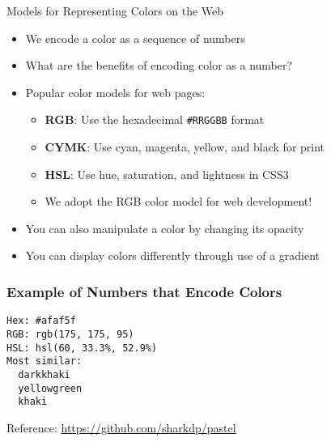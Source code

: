 \documentclass[14pt,aspectratio=169]{beamer}
\begin{document}
%
\begin{frame}{Models for Representing Colors on the Web}
  \begin{itemize}
    \item We encode a color as a sequence of numbers
      \vspace*{-.2in}
    \item What are the benefits of encoding color as a number?
      \vspace*{-.2in}
    \item Popular color models for web pages:
      \begin{itemize}
        \item {\bf RGB}: Use the hexadecimal {\tt \#RRGGBB} format
        \item {\bf CYMK}: Use cyan, magenta, yellow, and black for print
        \item {\bf HSL}: Use hue, saturation, and lightness in CSS3
        \item We adopt the RGB color model for web development!
      \end{itemize}
      \vspace*{-.25in}
    \item You can also manipulate a color by changing its opacity
      \vspace*{-.25in}
    \item You can display colors differently through use of a gradient
  \end{itemize}
\end{frame}

%
\begin{frame}[fragile]
  \frametitle{Example of Numbers that Encode Colors}
  \normalsize
  \begin{minipage}{6in}
    \vspace*{.1in}
    \begin{verbatim}
Hex: #afaf5f
RGB: rgb(175, 175, 95)
HSL: hsl(60, 33.3%, 52.9%)
Most similar:
  darkkhaki
  yellowgreen
  khaki
    \end{verbatim}
  \end{minipage}
  \vspace*{.1in}
  \begin{center}
    Reference: \url{https://github.com/sharkdp/pastel}
  \end{center}
\end{frame}
\end{document}
